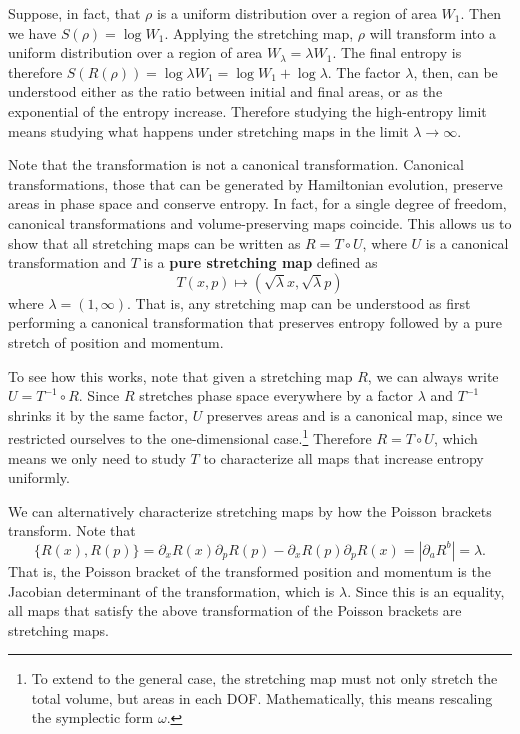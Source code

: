 \documentclass{SciPost}
\begin{document}
Suppose, in fact, that $\rho$ is a uniform distribution over a region of area $W_1$. Then we have $S(\rho)= \log W_1$. Applying the stretching map, $\rho$ will transform into a uniform distribution over a region of area $W_{\lambda} = \lambda W_1$. The final entropy is therefore $S(R(\rho)) = \log \lambda W_1 = \log W_1 + \log \lambda$. The factor $\lambda$, then, can be understood either as the ratio between initial and final areas, or as the exponential of the entropy increase. Therefore studying the high-entropy limit means studying what happens under stretching maps in the limit $\lambda \to \infty$.

Note that the transformation is not a canonical transformation. Canonical transformations, those that can be generated by Hamiltonian evolution, preserve areas in phase space and conserve entropy. In fact, for a single degree of freedom, canonical transformations and volume-preserving maps coincide. This allows us to show that all stretching maps can be written as $R = T \circ U$, where $U$ is a canonical transformation and $T$ is a \textbf{pure stretching map} defined as
\begin{equation}
	T(x,p) \mapsto (\sqrt{\lambda} x, \sqrt{\lambda} p)
\end{equation}
where $\lambda = (1,\infty)$. That is, any stretching map can be understood as first performing a canonical transformation that preserves entropy followed by a pure stretch of position and momentum.

To see how this works, note that given a stretching map $R$, we can always write $U = T^{-1} \circ R$. Since $R$ stretches phase space everywhere by a factor $\lambda$ and $T^{-1}$ shrinks it by the same factor, $U$ preserves areas and is a canonical map, since we restricted ourselves to the one-dimensional case.\footnote{To extend to the general case, the stretching map must not only stretch the total volume, but areas in each DOF. Mathematically, this means rescaling the symplectic form $\omega$.} Therefore $R = T \circ U$, which means we only need to study $T$ to characterize all maps that increase entropy uniformly.

We can alternatively characterize stretching maps by how the  Poisson brackets transform. Note that
\begin{equation}
	\{R(x),R(p)\} = \partial_x R(x) \partial_p R(p) - \partial_x R(p) \partial_p R(x) = | \partial_a R^b | = \lambda.
\end{equation}
That is, the Poisson bracket of the transformed position and momentum is the Jacobian determinant of the transformation, which is $\lambda$. Since this is an equality, all maps that satisfy the above transformation of the Poisson brackets are stretching maps.
\end{document}
